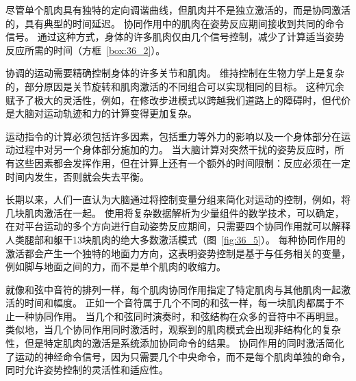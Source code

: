 尽管单个肌肉具有独特的定向调谐曲线，但肌肉并不是独立激活的，而是协同激活的，具有典型的时间延迟。
协同作用中的肌肉在姿势反应期间接收到共同的命令信号。
通过这种方式，身体的许多肌肉仅由几个信号控制，减少了计算适当姿势反应所需的时间（方框~\ref{box:36_2}）。


\begin{proposition}[肌肉的协同激活] \label{box:36_2}
	
	\quad \quad 协调的运动需要精确控制身体的许多关节和肌肉。
	维持控制在生物力学上是复杂的，部分原因是关节旋转和肌肉激活的不同组合可以实现相同的目标。
	这种冗余赋予了极大的灵活性，例如，在修改步进模式以跨越我们道路上的障碍时，但代价是大脑对运动轨迹和力的计算变得更加复杂。
	
	\quad \quad 运动指令的计算必须包括许多因素，包括重力等外力的影响以及一个身体部分在运动过程中对另一个身体部分施加的力。
	当大脑计算对突然干扰的姿势反应时，所有这些因素都会发挥作用，但在计算上还有一个额外的时间限制：反应必须在一定时间内发生，否则就会失去平衡。
	
	\quad \quad 长期以来，人们一直认为大脑通过将控制变量分组来简化对运动的控制，例如，将几块肌肉激活在一起。
	使用将复杂数据解析为少量组件的数学技术，可以确定，在对平台运动的多个方向进行自动姿势反应期间，只需要四个协同作用就可以解释人类腿部和躯干13块肌肉的绝大多数激活模式（图~\ref{fig:36_5}）。
	每种协同作用的激活都会产生一个独特的地面力方向，这表明姿势控制是基于与任务相关的变量，例如脚与地面之间的力，而不是单个肌肉的收缩力。
	
	\quad \quad 就像和弦中音符的排列一样，每个肌肉协同作用指定了特定肌肉与其他肌肉一起激活的时间和幅度。
	正如一个音符属于几个不同的和弦一样，每一块肌肉都属于不止一种协同作用。
	当几个和弦同时演奏时，和弦结构在众多的音符中不再明显。
	类似地，当几个协同作用同时激活时，观察到的肌肉模式会出现非结构化的复杂性，但是特定肌肉的激活是系统添加协同命令的结果。
	协同作用的同时激活简化了运动的神经命令信号，因为只需要几个中央命令，而不是每个肌肉单独的命令，同时允许姿势控制的灵活性和适应性。
	
\end{proposition}


